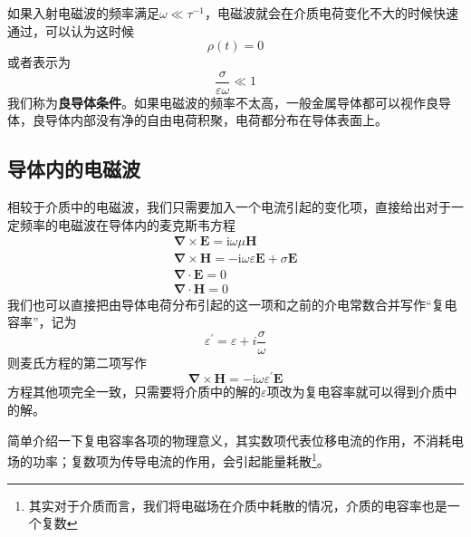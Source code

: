         如果入射电磁波的频率满足$\omega \ll \tau^{-1}$，电磁波就会在介质电荷变化不大的时候快速通过，可以认为这时候\[\rho(t)=0\]或者表示为
        \begin{equation}
            \frac{\sigma}{\varepsilon \omega} \ll 1
        \end{equation}
        我们称为\textbf{良导体条件}。如果电磁波的频率不太高，一般金属导体都可以视作良导体，良导体内部没有净的自由电荷积聚，电荷都分布在导体表面上。
    \subsection{导体内的电磁波}
        相较于介质中的电磁波，我们只需要加入一个电流引起的变化项，直接给出对于一定频率的电磁波在导体内的麦克斯韦方程
        \begin{equation}
            \begin{gathered}
            \boldsymbol{\nabla} \times \boldsymbol{E}=\mathrm{i} \omega \mu \boldsymbol{H} \\
            \boldsymbol{\nabla} \times \boldsymbol{H}=-\mathrm{i} \omega \varepsilon\boldsymbol{E}+\sigma \boldsymbol{E} \\
            \boldsymbol{\nabla} \cdot \boldsymbol{E}=0 \\
            \boldsymbol{\nabla} \cdot \boldsymbol{H}=0
            \end{gathered}
        \end{equation}
        我们也可以直接把由导体电荷分布引起的这一项和之前的介电常数合并写作“复电容率”，记为
        \begin{equation}
            \varepsilon^\prime = \varepsilon + i \frac{\sigma}{\omega}
        \end{equation}
        则麦氏方程的第二项写作\[\boldsymbol{\nabla} \times \boldsymbol{H}=-\mathrm{i} \omega \varepsilon^\prime \boldsymbol{E}\]方程其他项完全一致，只需要将介质中的解的$\varepsilon$项改为复电容率就可以得到介质中的解。 

        简单介绍一下复电容率各项的物理意义，其实数项代表位移电流的作用，不消耗电场的功率；复数项为传导电流的作用，会引起能量耗散\footnote{其实对于介质而言，我们将电磁场在介质中耗散的情况，介质的电容率也是一个复数}。

